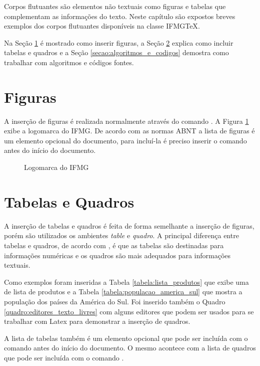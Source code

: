 Corpos flutuantes são elementos não textuais como figuras e tabelas que complementam as informações do texto. Neste capítulo são expostos breves exemplos dos corpos flutuantes disponíveis na classe {IFMG\TeX}.

Na Seção \ref{secao:figuras} é mostrado como inserir figuras, a Seção \ref{secao:tabelas_e_quadros} explica como incluir tabelas e quadros e a Seção \ref{secao:algoritmos_e_codigos} demostra como trabalhar com algoritmos e códigos fontes.

\section{Figuras}
\label{secao:figuras}

A inserção de figuras é realizada normalmente através do comando . A Figura \ref{figura:logomarca_ifmg} exibe a logomarca do IFMG. De acordo com as normas ABNT a lista de figuras é um elemento opcional do documento, para incluí-la é preciso inserir o comando  antes do início do documento.

\begin{figure}[htb]  \centering
 \iflogo
 \caption{Logomarca do IFMG} \label{figura:logomarca_ifmg}
\end{figure}

\section{Tabelas e Quadros}
\label{secao:tabelas_e_quadros}

A inserção de tabelas e quadros é feita de forma semelhante a inserção de figuras, porém são utilizados os ambientes \textit{table} e \textit{quadro}. A principal diferença entre tabelas e quadros, de acordo com \citet{castro:2016:manual}, é que as tabelas são destinadas para informações numéricas e os quadros são mais adequados para informações textuais.

Como exemplos foram inseridas a Tabela \ref{tabela:lista_produtos} que exibe uma de lista de produtos e a Tabela \ref{tabela:populacao_america_sul} que mostra a população dos países da América do Sul. Foi inserido também o Quadro \ref{quadro:editores_texto_livres} com alguns editores que podem ser usados para se trabalhar com Latex para demonstrar a inserção de quadros.

 A lista de tabelas também é um elemento opcional que pode ser incluída com o comando  antes do início do documento. O mesmo acontece com a lista de quadros que pode ser incluída com o comando .

